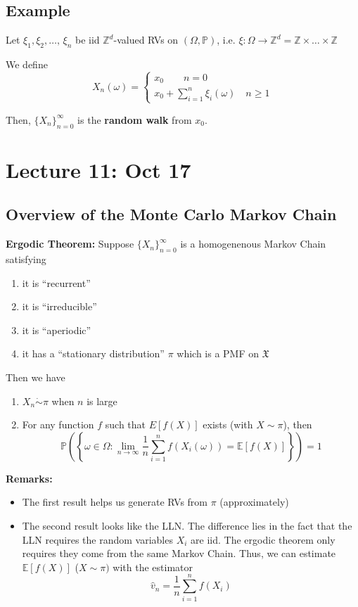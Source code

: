 \documentclass[12pt]{article}
\renewcommand{\hat}[1]{\widehat{#1}}
\renewcommand{\P}{\mathbb{P}}
\newcommand{\E}{\mathbb{E}}
\newcommand{\mfX}{\mathfrak{X}}
\newcommand{\Z}{\mathbb{Z}}
\begin{document}
\subsection*{Example}
Let $\xi_1, \xi_2, \dots,\, \xi_n$ be iid $\Z^d$-valued RVs on $(\Omega, \P)$, i.e. $\xi: \Omega \to \Z^d = \Z \times \dots \times \Z$

We define 
\[X_n(\omega) = \begin{cases}
    x_0 \qquad {n=0}\\
    x_0 + \sum_{i=1}^n \xi_i(\omega) \quad n \geq 1
\end{cases}\]

Then, $\{X_n\}_{n=0}^\infty$ is the \textbf{random walk} from $x_0$. 

\section*{Lecture 11: Oct 17}
\subsection*{Overview of the Monte Carlo Markov Chain} 

\textbf{Ergodic Theorem:} Suppose $\{X_n\}_{n=0}^\infty$ is a homogenenous Markov Chain satisfying 
\begin{enumerate}
    \item it is ``recurrent''
    \item it is ``irreducible''
    \item it is ``aperiodic''
    \item it has a ``stationary distribution'' $\pi$ which is a PMF on $\mfX$
\end{enumerate}
Then we have 
\begin{enumerate}
    \item $X_n \dot \sim \pi$ when $n$ is large
    \item For any function $f$ such that $E[f(X)]$ exists (with $X \sim \pi$), then 
    \[\P\left(\left\{\omega \in \Omega: \lim_{n\to\infty} \frac{1}{n}\sum_{i=1}^n f(X_i(\omega)) = \E[f(X)]\right\}\right) = 1\]
\end{enumerate}

\textbf{Remarks:}
\begin{itemize}
    \item The first result helps us generate RVs from $\pi$ (approximately)
    \item The second result looks like the LLN. The difference lies in the fact that the LLN requires the random variables $X_i$ are iid. The ergodic theorem only requires they come from the same Markov Chain. Thus, we can estimate $\E[f(X)]$ ($X \sim \pi)$ with the estimator 
    \[\hat v_n = \frac{1}{n}\sum_{i=1}^n f(X_i)\]
\end{itemize}
\end{document}
